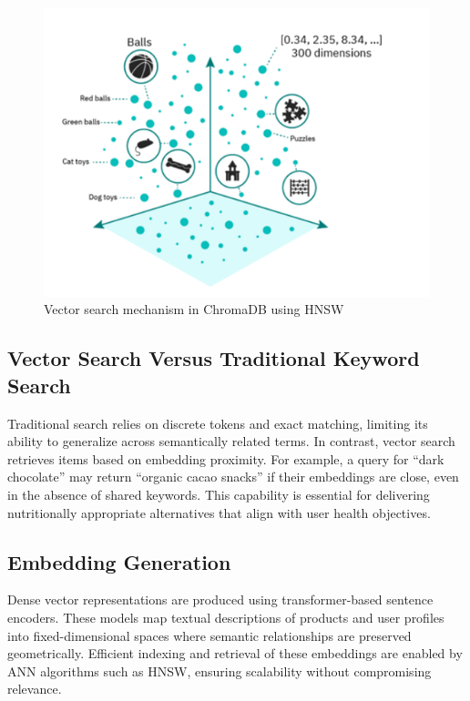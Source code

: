 \begin{figure}[H]
    \centering
    \includegraphics[scale=0.66]{images/chroma_space.png}
    \caption{Vector search mechanism in ChromaDB using HNSW}
    \label{fig:vector_search}
\end{figure}

\subsection{Vector Search Versus Traditional Keyword Search}
Traditional search relies on discrete tokens and exact matching, limiting
its ability to generalize across semantically related terms. In contrast,
vector search retrieves items based on embedding proximity. For example,
a query for “dark chocolate” may return “organic cacao snacks” if their
embeddings are close, even in the absence of shared keywords. This
capability is essential for delivering nutritionally appropriate alternatives
that align with user health objectives.

\subsection{Embedding Generation}
Dense vector representations are produced using transformer-based sentence encoders. These models map textual descriptions of products and
user profiles into fixed-dimensional spaces where semantic relationships
are preserved geometrically. Efficient indexing and retrieval of these
embeddings are enabled by ANN algorithms such as HNSW, ensuring
scalability without compromising relevance.

